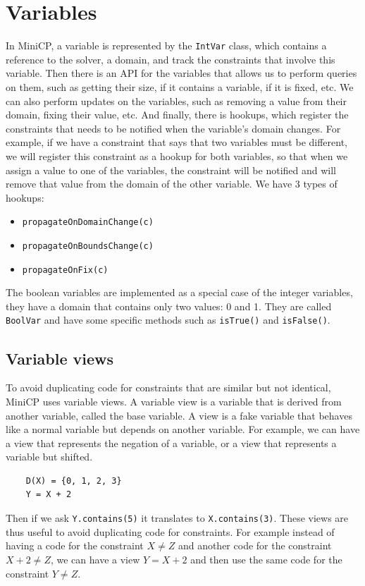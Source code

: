 \documentclass[12pt, openany]{report}
\theoremstyle{definition}
\begin{document}
\section{Variables}
In MiniCP, a variable is represented by the \texttt{IntVar} class, which contains a reference to the solver, a domain, and track the constraints that involve this variable. Then there is an API for the variables that allows us to perform queries on them, such as getting their size, if it contains a variable, if it is fixed, etc. We can also perform updates on the variables, such as removing a value from their domain, fixing their value, etc. And finally, there is hookups, which register the constraints that needs to be notified when the variable's domain changes. For example, if we have a constraint that says that two variables must be different, we will register this constraint as a hookup for both variables, so that when we assign a value to one of the variables, the constraint will be notified and will remove that value from the domain of the other variable. We have 3 types of hookups:
\begin{itemize}
    \item \texttt{propagateOnDomainChange(c)}
    \item \texttt{propagateOnBoundsChange(c)}
    \item \texttt{propagateOnFix(c)}
\end{itemize}
The boolean variables are implemented as a special case of the integer variables, they have a domain that contains only two values: 0 and 1. They are called \texttt{BoolVar} and have some specific methods such as \texttt{isTrue()} and \texttt{isFalse()}.  
\subsection{Variable views}
To avoid duplicating code for constraints that are similar but not identical, MiniCP uses variable views. A variable view is a variable that is derived from another variable, called the base variable. A view is a fake variable that behaves like a normal variable but depends on another variable. For example, we can have a view that represents the negation of a variable, or a view that represents a variable but shifted. 
\begin{lstlisting}
    D(X) = {0, 1, 2, 3}
    Y = X + 2
\end{lstlisting}
Then if we ask \texttt{Y.contains(5)} it translates to \texttt{X.contains(3)}.
These views are thus useful to avoid duplicating code for constraints. For example instead of having a code for the constraint $X \neq Z$ and another code for the constraint $X + 2 \neq Z$, we can have a view $Y = X + 2$ and then use the same code for the constraint $Y \neq Z$. 
\end{document}
